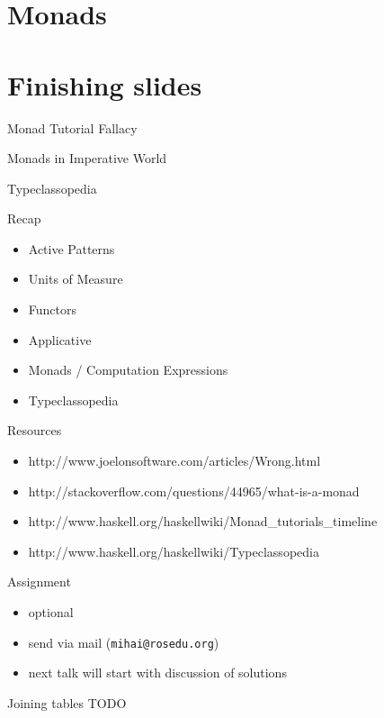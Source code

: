 \documentclass{beamer}
\begin{document}
\section{Monads}
\frame{\tableofcontents[currentsection]}

\section{Finishing slides}
\frame{\tableofcontents[currentsection]}

\begin{frame}{Monad Tutorial Fallacy}
\end{frame}

\begin{frame}{Monads in Imperative World}
\end{frame}

\begin{frame}{Typeclassopedia}
\end{frame}

\begin{frame}{Recap}
  \begin{itemize}[<+->]
    \item Active Patterns
    \item Units of Measure
    \item Functors
    \item Applicative
    \item Monads / Computation Expressions
    \item Typeclassopedia
  \end{itemize}
\end{frame}

\begin{frame}{Resources}
  \begin{itemize}
    \item http://www.joelonsoftware.com/articles/Wrong.html
    \item http://stackoverflow.com/questions/44965/what-is-a-monad
    \item http://www.haskell.org/haskellwiki/Monad\_tutorials\_timeline
    \item http://www.haskell.org/haskellwiki/Typeclassopedia
  \end{itemize}
\end{frame}

\begin{frame}[fragile]{Assignment}
  \begin{itemize}
    \item optional
    \item send via mail (\texttt{mihai@rosedu.org})
    \item next talk will start with discussion of solutions
  \end{itemize}
  \pause
  \begin{block}{Joining tables}
  TODO
  \end{block}
\end{frame}
\end{document}

